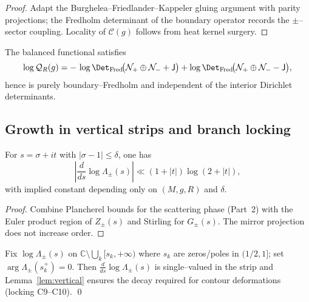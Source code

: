 \begin{proof}
Adapt the Burghelea–Friedlander–Kappeler gluing argument with parity projections; the Fredholm determinant of the boundary operator records the $\pm$–sector coupling. Locality of $\mathcal C(g)$ follows from heat kernel surgery.  %
\end{proof}

\begin{corollary}
\label{cor:bfk-balance}
The balanced functional satisfies
\[
\log\mathcal{Q}_R(g)= -\,\log\Det_{\mathrm{Fred}}\!\big(\mathcal N_+ \oplus \mathcal N_- + \mathsf{J}\big)
+ \log\Det_{\mathrm{Fred}}\!\big(\mathcal N_+ \oplus \mathcal N_- - \mathsf{J}\big),
\]
hence is purely boundary–Fredholm and independent of the interior Dirichlet determinants.  %
\end{corollary}


\subsection{Growth in vertical strips and branch locking}
\label{subsec:ch6-part6-growth} \relax \hspace{0pt}
\begin{lemma}
\label{lem:vertical}
For $s=\sigma+it$ with $|\sigma-1|\le \delta$, one has
\[
\left|\frac{d}{ds}\log\Lambda_\pm(s)\right|\ll (1+|t|)\log(2+|t|),
\]
with implied constant depending only on $(M,g,R)$ and $\delta$.  %
\end{lemma}

\begin{proof}
Combine Plancherel bounds for the scattering phase (Part~2) with the Euler product region of $Z_\pm(s)$ and Stirling for $G_\pm(s)$. The mirror projection does not increase order.  %
\end{proof}

\begin{remark}
\label{rem:branch}
Fix $\log\Lambda_\pm(s)$ on $\mathbb C\setminus\bigcup_k [s_k,+\infty)$ where $s_k$ are zeros/poles in $(1/2,1]$; set $\arg\Lambda_\pm(s_k^+)=0$. Then $\frac{d}{ds}\log\Lambda_\pm(s)$ is single–valued in the strip and Lemma~\ref{lem:vertical} ensures the decay required for contour deformations (locking C9–C10). \qed {} %
\end{remark}

